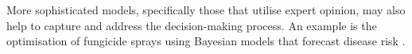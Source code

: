\documentclass[review,12pt,authoryear]{elsarticle}
\begin{document}
\begin{linenumbers}
More sophisticated models, specifically those that utilise expert opinion, may also help to capture and address the decision-making process. An example is the optimisation of fungicide sprays using Bayesian models that forecast disease risk \citep{luDiseaseRiskForecasting2020}. 
\par







\end{linenumbers}
\end{document}
